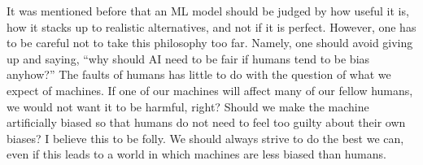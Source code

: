 It was mentioned before that an \ac{ML} model should be judged by how useful it is,
how it stacks up to realistic alternatives, and not if it is perfect.
However, one has to be careful not to take this philosophy too far.
Namely, one should avoid giving up and saying,
``why should AI need to be fair if humans tend to be bias anyhow?''
The faults of humans has little to do with the question of what we expect of machines.
If one of our machines will affect many of our fellow humans,
we would not want it to be harmful, right?
Should we make the machine artificially biased
so that humans do not need to feel too guilty about their own biases?
I believe this to be folly.
We should always strive to do the best we can,
even if this leads to a world in which machines are less biased than humans.

